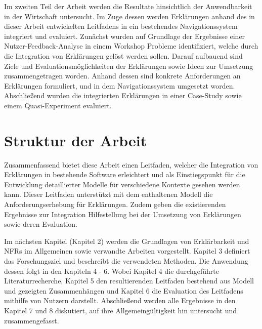 Im zweiten Teil der Arbeit werden die Resultate hinsichtlich der Anwendbarkeit in der Wirtschaft untersucht. Im Zuge dessen werden Erklärungen anhand des in dieser Arbeit entwickelten Leitfadens in ein bestehendes Navigationssystem integriert und evaluiert. Zunächst wurden auf Grundlage der Ergebnisse einer Nutzer-Feedback-Analyse in einem Workshop Probleme identifiziert, welche durch die Integration von Erklärungen gelöst werden sollen. Darauf aufbauend sind Ziele und Evaluationsmöglichkeiten der Erklärungen sowie Ideen zur Umsetzung zusammengetragen worden. Anhand dessen sind konkrete Anforderungen an Erklärungen formuliert, und in dem Navigationssystem umgesetzt worden. Abschließend wurden die integrierten Erklärungen in einer Case-Study sowie einem Quasi-Experiment evaluiert.

\section{Struktur der Arbeit}

Zusammenfassend bietet diese Arbeit einen Leitfaden, welcher die Integration von Erklärungen in bestehende Software erleichtert und als Einstiegspunkt für die Entwicklung detaillierter Modelle für verschiedene Kontexte gesehen werden kann. Dieser Leitfaden unterstützt mit dem enthaltenen Modell die Anforderungserhebung für Erklärungen. Zudem geben die existierenden Ergebnisse zur Integration Hilfestellung bei der Umsetzung von Erklärungen sowie deren Evaluation.

Im nächsten Kapitel (Kapitel 2) werden die Grundlagen von Erklärbarkeit und NFRs im Allgemeinen sowie verwandte Arbeiten vorgestellt. Kapitel 3 definiert das Forschungsziel und beschreibt die verwendeten Methoden. Die Anwendung dessen folgt in den Kapiteln 4 - 6. Wobei Kapitel 4 die durchgeführte Literaturrecherche, Kapitel 5 den resultierenden Leitfaden bestehend aus Modell und gezeigten Zusammenhängen und Kapitel 6 die Evaluation des Leitfadens mithilfe von Nutzern darstellt. Abschließend werden alle Ergebnisse in den Kapitel 7 und 8 diskutiert, auf ihre Allgemeingültigkeit hin untersucht und zusammengefasst.